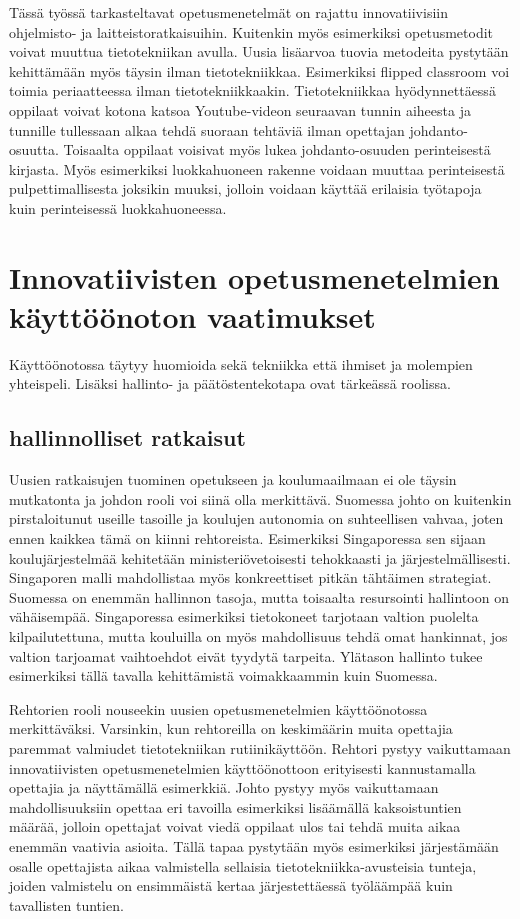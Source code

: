 \documentclass[utf8,bachelor]{gradu3}
\begin{document}
Tässä työssä tarkasteltavat opetusmenetelmät on rajattu innovatiivisiin ohjelmisto- ja laitteistoratkaisuihin. Kuitenkin myös esimerkiksi opetusmetodit voivat muuttua tietotekniikan avulla. Uusia lisäarvoa tuovia metodeita pystytään kehittämään myös täysin ilman tietotekniikkaa. Esimerkiksi flipped classroom voi toimia periaatteessa ilman tietotekniikkaakin. Tietotekniikkaa hyödynnettäessä oppilaat voivat kotona katsoa Youtube-videon seuraavan tunnin aiheesta ja tunnille tullessaan alkaa tehdä suoraan tehtäviä ilman opettajan johdanto-osuutta. Toisaalta oppilaat voisivat myös lukea johdanto-osuuden perinteisestä kirjasta. \parencite[][]{flipped} Myös esimerkiksi luokkahuoneen rakenne voidaan muuttaa perinteisestä pulpettimallisesta joksikin muuksi, jolloin voidaan käyttää erilaisia työtapoja kuin perinteisessä luokkahuoneessa.


\section{Innovatiivisten opetusmenetelmien käyttöönoton vaatimukset}
Käyttöönotossa täytyy huomioida sekä tekniikka että ihmiset ja molempien yhteispeli. Lisäksi hallinto- ja päätöstentekotapa ovat tärkeässä roolissa.
\subsection{hallinnolliset ratkaisut}
Uusien ratkaisujen tuominen opetukseen ja koulumaailmaan ei ole täysin mutkatonta ja johdon rooli voi siinä olla merkittävä. Suomessa johto on kuitenkin pirstaloitunut useille tasoille ja koulujen autonomia on suhteellisen vahvaa, joten ennen kaikkea tämä on kiinni rehtoreista. Esimerkiksi Singaporessa sen sijaan koulujärjestelmää kehitetään ministeriövetoisesti tehokkaasti ja järjestelmällisesti. Singaporen malli mahdollistaa myös konkreettiset pitkän tähtäimen strategiat. Suomessa on enemmän hallinnon tasoja, mutta toisaalta resursointi hallintoon on vähäisempää. Singaporessa esimerkiksi tietokoneet tarjotaan valtion puolelta kilpailutettuna, mutta kouluilla on myös mahdollisuus tehdä omat hankinnat, jos valtion tarjoamat vaihtoehdot eivät tyydytä tarpeita. Ylätason hallinto tukee esimerkiksi tällä tavalla kehittämistä voimakkaammin kuin Suomessa. \parencite[][]{koulunArki}

Rehtorien rooli nouseekin uusien opetusmenetelmien käyttöönotossa merkittäväksi. Varsinkin, kun rehtoreilla on keskimäärin muita opettajia paremmat valmiudet tietotekniikan rutiinikäyttöön. \parencite[][]{itviikkoWilen} Rehtori pystyy vaikuttamaan innovatiivisten opetusmenetelmien käyttöönottoon erityisesti kannustamalla opettajia ja näyttämällä esimerkkiä. Johto pystyy myös vaikuttamaan mahdollisuuksiin opettaa eri tavoilla esimerkiksi lisäämällä kaksoistuntien määrää, jolloin opettajat voivat viedä oppilaat ulos tai tehdä muita aikaa enemmän vaativia asioita. Tällä tapaa pystytään myös esimerkiksi järjestämään osalle opettajista aikaa valmistella sellaisia tietotekniikka-avusteisia tunteja, joiden valmistelu on ensimmäistä kertaa järjestettäessä työläämpää kuin tavallisten tuntien.
\end{document}
